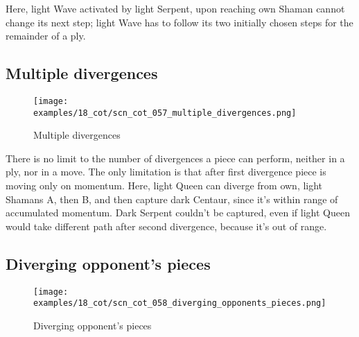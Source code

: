 Here, light Wave activated by light Serpent, upon reaching own Shaman cannot change
its next step; light Wave has to follow its two initially chosen steps for the
remainder of a ply.

\clearpage %

\subsection*{Multiple divergences}
\label{sec:Conquest of Tlalocan/Divergence/Multiple divergences}

\vspace*{-1.4\baselineskip}
\noindent
\begin{figure}[!h]
\texttt{[image: examples/18\_cot/scn\_cot\_057\_multiple\_divergences.png]}
\vspace*{-1.3\baselineskip}
\caption{Multiple divergences}
\label{fig:scn_cot_057_multiple_divergences}
\end{figure}

\vspace*{-0.5\baselineskip}
There is no limit to the number of divergences a piece can perform, neither in a ply,
nor in a move. The only limitation is that after first divergence piece is moving
only on momentum.\newline
\indent
Here, light Queen can diverge from own, light Shamans A, then B, and then capture
dark Centaur, since it's within range of accumulated momentum. Dark Serpent couldn't
be captured, even if light Queen would take different path after second divergence,
because it's out of range.

\clearpage %

\subsection*{Diverging opponent's pieces}
\label{sec:Conquest of Tlalocan/Divergence/Diverging opponent's pieces}

\vspace*{-1.4\baselineskip}
\noindent
\begin{figure}[!h]
\texttt{[image: examples/18\_cot/scn\_cot\_058\_diverging\_opponents\_pieces.png]}
\vspace*{-1.3\baselineskip}
\caption{Diverging opponent's pieces}
\label{fig:scn_cot_058_diverging_opponents_pieces}
\end{figure}

